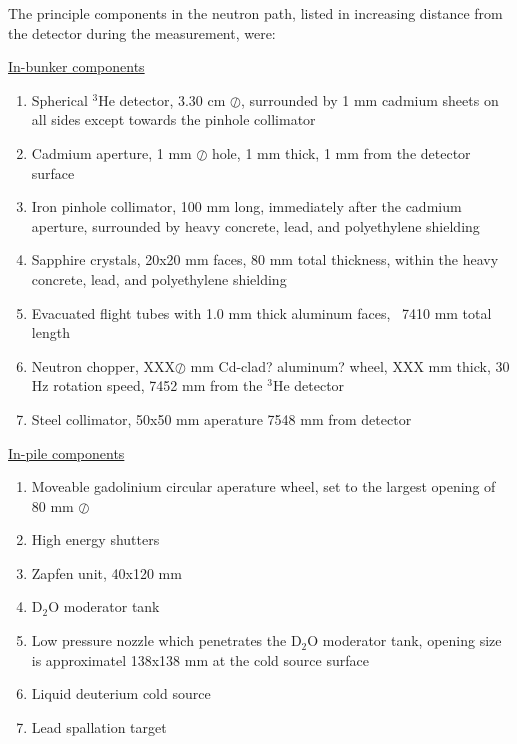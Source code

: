 \documentclass[5p,12pt]{elsarticle}
\begin{document}
The principle components in the neutron path, listed in increasing distance from the detector during the measurement, were:

\begin{center} \underline{In-bunker components}\end{center}
\begin{enumerate}
  \item Spherical $^3$He detector, 3.30 cm $\oslash$, surrounded by 1 mm cadmium sheets on all sides except towards the pinhole collimator
  \item Cadmium aperture, 1 mm $\oslash$ hole, 1 mm thick, 1 mm from the detector surface
  \item Iron pinhole collimator, 100 mm long, immediately after the cadmium aperture, surrounded by heavy concrete, lead, and polyethylene shielding
  \item Sapphire crystals, 20x20 mm faces, 80 mm total thickness, within the heavy concrete, lead, and polyethylene shielding
  \item Evacuated flight tubes with 1.0 mm thick aluminum faces, ~7410 mm total length 
  \item Neutron chopper, XXX$\oslash$ mm Cd-clad? aluminum? wheel, XXX mm thick, 30 Hz rotation speed,  7452 mm from the $^3$He detector
  \item Steel collimator, 50x50 mm aperature 7548 mm from detector
\end{enumerate}
\begin{center}\underline{In-pile components}\end{center}
\begin{enumerate}[resume]
  \item Moveable gadolinium circular aperature wheel, set to the largest opening of 80 mm $\oslash$
  \item High energy shutters
  \item Zapfen unit, 40x120 mm
  \item D$_2$O moderator tank
  \item Low pressure nozzle which penetrates the D$_2$O moderator tank, opening size is approximatel 138x138 mm at the cold source surface
  \item Liquid deuterium cold source
  \item Lead spallation target
\end{enumerate}
\end{document}
